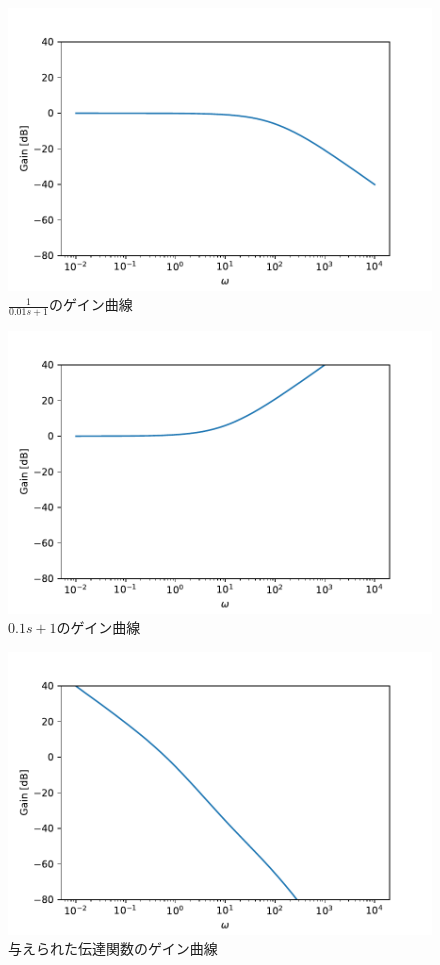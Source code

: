 \begin{figure}[H]
    \centering
    \includegraphics[scale=0.75]{3.pdf}
    \caption{$\frac{1}{0.01s+1}$のゲイン曲線}
\end{figure}
\begin{figure}[H]
    \centering
    \includegraphics[scale=0.75]{4.pdf}
    \caption{$0.1s+1$のゲイン曲線}
\end{figure}
\begin{figure}[H]
    \centering
    \includegraphics[scale=0.75]{5.pdf}
    \caption{与えられた伝達関数のゲイン曲線}
\end{figure}

\newpage
